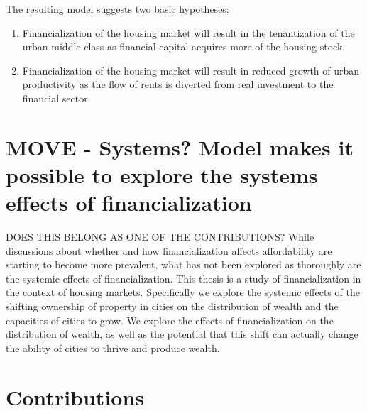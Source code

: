 The resulting model suggests two basic hypotheses:
\begin{enumerate}
    \item Financialization of the housing market will result in the tenantization of the urban middle class as financial capital acquires more of the housing stock. %
    \item Financialization of the housing market will result in reduced growth of urban productivity as the flow of rents is diverted from real investment to the financial sector.
\end{enumerate} 

\section{MOVE - Systems? Model makes it possible to explore the systems effects of financialization}
DOES THIS BELONG AS ONE OF THE CONTRIBUTIONS?
While discussions about whether and how financialization affects affordability are starting to become more prevalent, what has not been explored as thoroughly are the systemic effects of financialization.  
This thesis is a study of financialization in the context of housing markets. Specifically we explore the systemic effects of the shifting ownership of property in cities on the distribution of wealth and the capacities of cities to grow. We explore the effects of financialization on the distribution of wealth, as well as the potential that this shift can actually change the ability of cities to thrive and produce wealth.

 
\section{Contributions}

